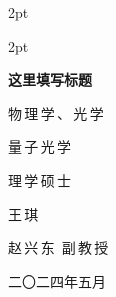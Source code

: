 {
 \setlength\parindent{0em}               %
\vspace*{-0.55cm}
\begin{flushleft}
     {\fontsize{13pt} {2pt} 
     {\quad\quad\quad\:\:\:\:\:} }  %
\end{flushleft}
\vspace*{-0.83cm}
\begin{flushleft}
     {\fontsize{13pt} {2pt} 
     {\quad\quad\quad\quad\:\:\:\:\:\:} } 
\end{flushleft}}

{   
    \heiti  %
 
\vspace*{8.1cm}
\begin{center}      
 { \textbf{这里填写标题} }    
\end{center}

\vspace*{3.21cm}
\begin{flushleft}     
 {\fontsize{15pt}{1pt} \qquad\qquad\qquad\qquad\qquad\qquad\qquad\qquad\quad\:\:
 {物\,理\,学\,、\,光\,学}}
\end{flushleft}
 \vspace*{-0.87cm}
\begin{flushleft} 
{\fontsize{15pt}{1pt} \qquad\qquad\qquad\qquad\qquad\qquad\qquad\qquad\quad\:\:
  {量\,子\,光\,学}}    
\end{flushleft}
 \vspace*{-0.87cm}
\begin{flushleft} 
{\fontsize{15pt}{1pt} \qquad\qquad\qquad\qquad\qquad\qquad\qquad\qquad\quad\:\:
{理\,学\,硕\,士}}    
\end{flushleft}
 \vspace*{-0.83cm}
\begin{flushleft} 
{\fontsize{15pt}{1pt} \qquad\qquad\qquad\qquad\qquad\qquad\qquad\qquad\quad\:\:
  {王\,琪}}    
\end{flushleft}
 \vspace*{-0.87cm}
\begin{flushleft} 
{\fontsize{15pt}{1pt} \qquad\qquad\qquad\qquad\qquad\qquad\qquad\qquad\quad\:\:
  {赵\,兴\,东\:\, 副\,教\,授}}    
\end{flushleft}
 \vspace*{-1cm}
\begin{flushleft} 
{\fontsize{15pt}{5pt} \qquad\qquad\qquad\qquad\qquad\qquad\qquad\qquad\quad\:\:
  {\:}}    %
\end{flushleft}
 \vspace*{-0.3cm}
\begin{center} 
{\fontsize{15pt}{5pt} 二〇二四年五月}  
\end{center}

}
